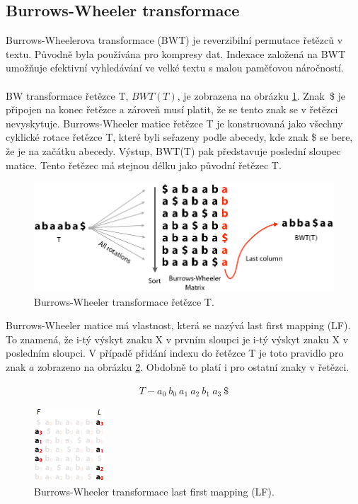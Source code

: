 \documentclass[czech,DP]{thesiskiv}
\numberwithin{equation}{section}
\begin{document}
\subsection{Burrows-Wheeler transformace}
Burrows-Wheelerova transformace (BWT) je reverzibilní permutace řetězců v textu. Původně byla používána pro kompresy dat. Indexace založená na BWT umožňuje efektivní vyhledávání ve velké textu s malou paměťovou náročností. 
\\
\\
BW transformace řetězce T, $BWT(T)$, je zobrazena na obrázku \ref{fig:bw_transform_1}. Znak~\$ je připojen na konec řetězce a zároveň musí platit, že se tento znak se v řetězci nevyskytuje. Burrows-Wheeler matice řetězce T je konstruovaná jako všechny cyklické rotace řetězce T, které byli seřazeny podle abecedy, kde znak \$ se bere, že je na začátku abecedy. Výstup, BWT(T) pak představuje poslední sloupec matice. Tento řetězec má stejnou délku jako původní řetězec T. \cite{bowtie} 

\begin{figure}[H]		
		\centering
		\includegraphics[width=.8\textwidth]{./img/BWT_1.png}
		\caption{Burrows-Wheeler transformace řetězce T. \cite{bw_transform}}
		\label{fig:bw_transform_1}
\end{figure}

\noindent
Burrows-Wheeler matice má vlastnost, která se nazývá last first mapping (LF). To znamená, že i-tý výskyt znaku X v prvním sloupci je i-tý výskyt znaku X v posledním sloupci. V případě přidání indexu do řetězce T je toto pravidlo pro znak $a$ zobrazeno na obrázku \ref{fig:bw_transform_lf}. Obdobně to platí i pro ostatní znaky v řetězci.

\begin{align}
   \label{rerezec_t} T - a_0 \: b_0 \: a_1 \: a_2 \: b_1 \: a_3 \: \$
\end{align}



\begin{figure}[H]		
		\centering
		\includegraphics[width=100px]{./img/BWT_2.png}
		\caption{Burrows-Wheeler transformace last first mapping (LF). \cite{bw_transform}}
		\label{fig:bw_transform_lf}
\end{figure}
\end{document}
